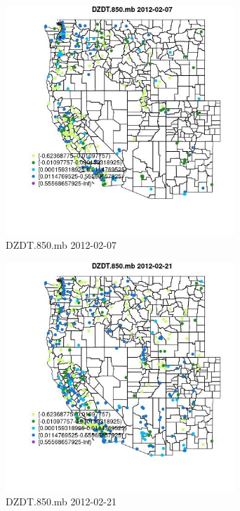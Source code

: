 \begin{figure} 
\centering  
\includegraphics[width=0.77\textwidth]{Code_Outputs/Report_ML_input_PM25_Step4_part_f_de_duplicated_aveswNAs_MapObsDZDT850mb2012-02-07.jpg} 
\caption{\label{fig:Report_ML_input_PM25_Step4_part_f_de_duplicated_aveswNAsMapObsDZDT850mb2012-02-07}DZDT.850.mb 2012-02-07} 
\end{figure} 
 

\begin{figure} 
\centering  
\includegraphics[width=0.77\textwidth]{Code_Outputs/Report_ML_input_PM25_Step4_part_f_de_duplicated_aveswNAs_MapObsDZDT850mb2012-02-21.jpg} 
\caption{\label{fig:Report_ML_input_PM25_Step4_part_f_de_duplicated_aveswNAsMapObsDZDT850mb2012-02-21}DZDT.850.mb 2012-02-21} 
\end{figure} 
 

